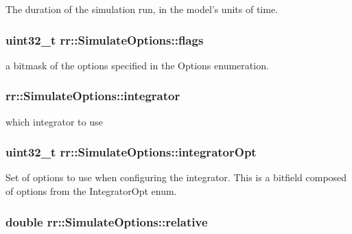 The duration of the simulation run, in the model's units of time. \hypertarget{structrr_1_1_simulate_options_a3dfd51256f939804a2c8d7f2c72b1bbb}{
\subsubsection[{flags}]{\setlength{\rightskip}{0pt plus 5cm}uint32\-\_\-t rr\-::\-Simulate\-Options\-::flags}}\label{structrr_1_1_simulate_options_a3dfd51256f939804a2c8d7f2c72b1bbb}
a bitmask of the options specified in the Options enumeration. \hypertarget{structrr_1_1_simulate_options_a21700122b4ef3ef310eed72c39a4804c}{
\subsubsection[{integrator}]{ rr\-::\-Simulate\-Options\-::integrator}}\label{structrr_1_1_simulate_options_a21700122b4ef3ef310eed72c39a4804c}
which integrator to use \hypertarget{structrr_1_1_simulate_options_a2a47baf7391cc689d36397ca51c5cc89}{
\subsubsection[{integrator\-Opt}]{\setlength{\rightskip}{0pt plus 5cm}uint32\-\_\-t rr\-::\-Simulate\-Options\-::integrator\-Opt}}\label{structrr_1_1_simulate_options_a2a47baf7391cc689d36397ca51c5cc89}
Set of options to use when configuring the integrator. This is a bitfield composed of options from the Integrator\-Opt enum. \hypertarget{structrr_1_1_simulate_options_ae51c0dd98194faf552b19dd3e3e39768}{
\subsubsection[{relative}]{\setlength{\rightskip}{0pt plus 5cm}double rr\-::\-Simulate\-Options\-::relative}}\label{structrr_1_1_simulate_options_ae51c0dd98194faf552b19dd3e3e39768}
